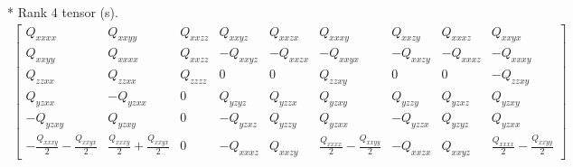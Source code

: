 \documentclass[fleqn,8pt,landscape]{jsarticle}
\begin{document}
* Rank 4 tensor (s).
\begin{align*}
\begin{bmatrix} Q_{xxxx} & Q_{xxyy} & Q_{xxzz} & Q_{xxyz} & Q_{xxzx} & Q_{xxxy} & Q_{xxzy} & Q_{xxxz} & Q_{xxyx} \\ Q_{xxyy} & Q_{xxxx} & Q_{xxzz} & - Q_{xxyz} & - Q_{xxzx} & - Q_{xxyx} & - Q_{xxzy} & - Q_{xxxz} & - Q_{xxxy} \\ Q_{zzxx} & Q_{zzxx} & Q_{zzzz} & 0 & 0 & Q_{zzxy} & 0 & 0 & - Q_{zzxy} \\ Q_{yzxx} & - Q_{yzxx} & 0 & Q_{yzyz} & Q_{yzzx} & Q_{yzxy} & Q_{yzzy} & Q_{yzxz} & Q_{yzxy} \\ - Q_{yzxy} & Q_{yzxy} & 0 & - Q_{yzxz} & Q_{yzzy} & Q_{yzxx} & - Q_{yzzx} & Q_{yzyz} & Q_{yzxx} \\ - \frac{Q_{xxxy}}{2} - \frac{Q_{xxyx}}{2} & \frac{Q_{xxxy}}{2} + \frac{Q_{xxyx}}{2} & 0 & - Q_{xxxz} & Q_{xxzy} & \frac{Q_{xxxx}}{2} - \frac{Q_{xxyy}}{2} & - Q_{xxzx} & Q_{xxyz} & \frac{Q_{xxxx}}{2} - \frac{Q_{xxyy}}{2} \end{bmatrix}
\end{align*}
\end{document}
